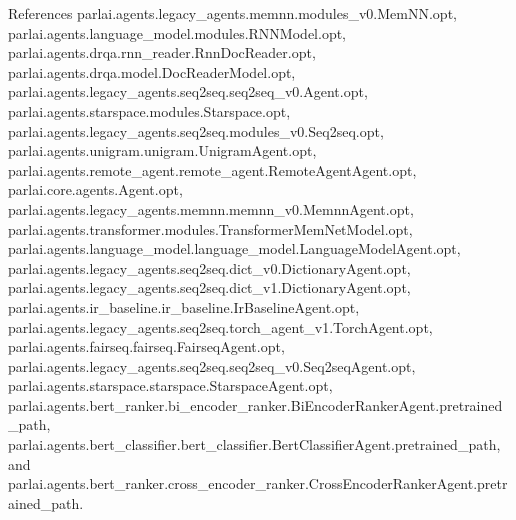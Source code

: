 References parlai.\+agents.\+legacy\+\_\+agents.\+memnn.\+modules\+\_\+v0.\+Mem\+N\+N.\+opt, parlai.\+agents.\+language\+\_\+model.\+modules.\+R\+N\+N\+Model.\+opt, parlai.\+agents.\+drqa.\+rnn\+\_\+reader.\+Rnn\+Doc\+Reader.\+opt, parlai.\+agents.\+drqa.\+model.\+Doc\+Reader\+Model.\+opt, parlai.\+agents.\+legacy\+\_\+agents.\+seq2seq.\+seq2seq\+\_\+v0.\+Agent.\+opt, parlai.\+agents.\+starspace.\+modules.\+Starspace.\+opt, parlai.\+agents.\+legacy\+\_\+agents.\+seq2seq.\+modules\+\_\+v0.\+Seq2seq.\+opt, parlai.\+agents.\+unigram.\+unigram.\+Unigram\+Agent.\+opt, parlai.\+agents.\+remote\+\_\+agent.\+remote\+\_\+agent.\+Remote\+Agent\+Agent.\+opt, parlai.\+core.\+agents.\+Agent.\+opt, parlai.\+agents.\+legacy\+\_\+agents.\+memnn.\+memnn\+\_\+v0.\+Memnn\+Agent.\+opt, parlai.\+agents.\+transformer.\+modules.\+Transformer\+Mem\+Net\+Model.\+opt, parlai.\+agents.\+language\+\_\+model.\+language\+\_\+model.\+Language\+Model\+Agent.\+opt, parlai.\+agents.\+legacy\+\_\+agents.\+seq2seq.\+dict\+\_\+v0.\+Dictionary\+Agent.\+opt, parlai.\+agents.\+legacy\+\_\+agents.\+seq2seq.\+dict\+\_\+v1.\+Dictionary\+Agent.\+opt, parlai.\+agents.\+ir\+\_\+baseline.\+ir\+\_\+baseline.\+Ir\+Baseline\+Agent.\+opt, parlai.\+agents.\+legacy\+\_\+agents.\+seq2seq.\+torch\+\_\+agent\+\_\+v1.\+Torch\+Agent.\+opt, parlai.\+agents.\+fairseq.\+fairseq.\+Fairseq\+Agent.\+opt, parlai.\+agents.\+legacy\+\_\+agents.\+seq2seq.\+seq2seq\+\_\+v0.\+Seq2seq\+Agent.\+opt, parlai.\+agents.\+starspace.\+starspace.\+Starspace\+Agent.\+opt, parlai.\+agents.\+bert\+\_\+ranker.\+bi\+\_\+encoder\+\_\+ranker.\+Bi\+Encoder\+Ranker\+Agent.\+pretrained\+\_\+path, parlai.\+agents.\+bert\+\_\+classifier.\+bert\+\_\+classifier.\+Bert\+Classifier\+Agent.\+pretrained\+\_\+path, and parlai.\+agents.\+bert\+\_\+ranker.\+cross\+\_\+encoder\+\_\+ranker.\+Cross\+Encoder\+Ranker\+Agent.\+pretrained\+\_\+path.

\mbox{\label{classparlai_1_1agents_1_1bert__ranker_1_1cross__encoder__ranker_1_1CrossEncoderRankerAgent_a0518d01be6a05fc2bc117f2c55cb6328}} 
